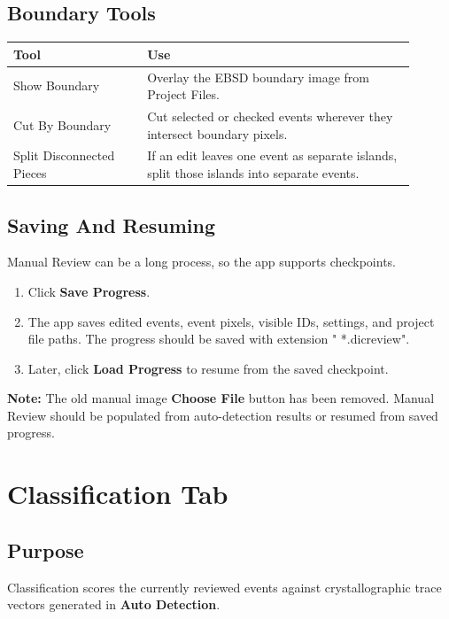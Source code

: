 \documentclass[11pt]{article}
\newcommand{\ui}[1]{\textbf{#1}}
\newcommand{\note}[1]{\vspace{0.3em}\noindent\textcolor{blue!70!black}{\textbf{Note:}} #1\vspace{0.3em}}
\begin{document}
\subsection{Boundary Tools}

\begin{longtable}{p{0.3\linewidth}p{0.6\linewidth}}
\toprule
\textbf{Tool} & \textbf{Use} \\
\midrule
Show Boundary & Overlay the EBSD boundary image from Project Files. \\
Cut By Boundary & Cut selected or checked events wherever they intersect boundary pixels. \\
Split Disconnected Pieces & If an edit leaves one event as separate islands, split those islands into separate events. \\
\bottomrule
\end{longtable}

\subsection{Saving And Resuming}

Manual Review can be a long process, so the app supports checkpoints.

\begin{enumerate}
    \item Click \ui{Save Progress}.
    \item The app saves edited events, event pixels, visible IDs, settings, and project file paths. The progress should be saved with extension " *.dicreview".
    \item Later, click \ui{Load Progress} to resume from the saved checkpoint.
\end{enumerate}

\note{The old manual image \ui{Choose File} button has been removed. Manual Review should be populated from auto-detection results or resumed from saved progress.}

\section{Classification Tab}

\subsection{Purpose}

Classification scores the currently reviewed events against crystallographic trace vectors generated in \ui{Auto Detection}.
\end{document}

